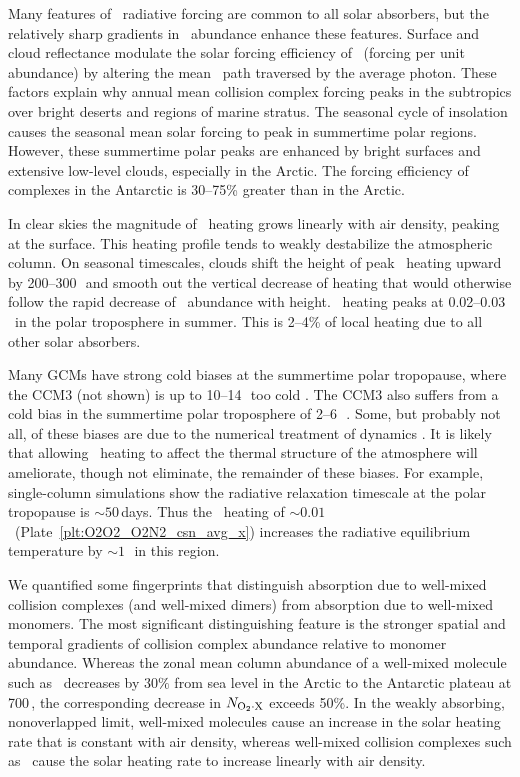 \documentclass[agupp,twoside]{aguplus} %
\begin{document}
Many features of \OdX\ radiative forcing are common to all solar
absorbers, but the relatively sharp gradients in \OdX\ abundance
enhance these features.
Surface and cloud reflectance modulate the solar forcing efficiency of
\OdX\ (forcing per unit abundance) by altering the mean \OdX\ path
traversed by the average photon.
These factors explain why annual mean collision complex forcing peaks
in the subtropics over bright deserts and regions of marine stratus.
The seasonal cycle of insolation causes the seasonal mean solar
forcing to peak in summertime polar regions.  
However, these summertime polar peaks are enhanced by bright surfaces
and extensive low-level clouds, especially in the Arctic.
The forcing efficiency of complexes in the Antarctic is 30--75\%
greater than in the Arctic.

In clear skies the magnitude of \OdX\ heating grows linearly with air
density, peaking at the surface.
This heating profile tends to weakly destabilize the atmospheric
column. 
On seasonal timescales, clouds shift the height of peak \OdX\
heating upward by 200--300\,\mb\ and smooth out the vertical decrease of
heating that would otherwise follow the rapid decrease of \OdX\
abundance with height. 
\OdX\ heating peaks at 0.02--0.03\,\kxd\ in the polar troposphere
in summer.
This is 2--4\% of local heating due to all other solar absorbers.

Many GCMs have strong cold biases at the summertime polar tropopause,
where the CCM3 (not shown) is up to 10--14\,\K\ too cold \cite[]{HKH98}. 
The CCM3 also suffers from a cold bias in the summertime polar
troposphere of 2--6\,\K\ \cite[]{BrB982}.    
Some, but probably not all, of these biases are due to the numerical 
treatment of dynamics \cite[]{WiO98}.
It is likely that allowing \OdX\ heating to affect the thermal
structure of the atmosphere will ameliorate, though not eliminate,
the remainder of these biases.
For example, single-column simulations show the radiative relaxation
timescale at the polar tropopause is $\sim 50$\,days. 
Thus the \OdX\ heating of $\sim 0.01$\,\kxd\
(Plate~\ref{plt:O2O2_O2N2_csn_avg_x}) increases the radiative
equilibrium temperature by $\sim 1$\,\K\ in this region.  

We quantified some fingerprints that distinguish absorption due to
well-mixed collision complexes (and well-mixed dimers) from absorption
due to well-mixed monomers.  
The most significant distinguishing feature is the stronger spatial and
temporal gradients of collision complex abundance relative to monomer
abundance. 
Whereas the zonal mean column abundance of a well-mixed molecule
such as \Od\ decreases by $30\%$ from sea level in the Arctic to the
Antarctic plateau at 700\,\mb, the corresponding decrease in $N_{\mathrm{O}_{2} \cdot \mathrm{X}}$ 
exceeds 50\%. 
In the weakly absorbing, nonoverlapped limit, well-mixed molecules
cause an increase in the solar heating rate that is constant with air
density, whereas well-mixed collision complexes such as \OdX\ cause
the solar heating rate to increase linearly with air density.  
\end{document}
